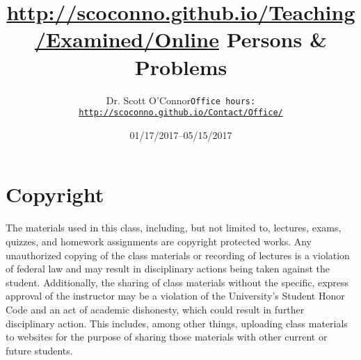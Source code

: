 \documentclass[article,oneside]{memoir}
\def\myauthor{Author}
\def\mytitle{Title}
\def\mycopyright{\myauthor}
\def\myweb{\href{http://scoconno.github.io/Teaching/Examined/Online}{http://scoconno.github.io/Teaching/Examined/Online}}
\def\myauthor{Dr. Scott O'Connor}
\def\mytitle{{\normalsize \myweb \newline} \HUGE Persons \& Problems}
\begin{document}
\setsansfont[Mapping=tex-text]{Myriad Pro} 
\setmonofont[Mapping=tex-text,Scale=0.8]{Georgia} 

\def\ind{\hangindent=1 true cm\hangafter=1 \noindent}
\def\labelitemi{$\cdot$}


\title{\LARGE \mytitle}     
\author{\Large\myauthor \newline \footnotesize\texttt{\noindent Office hours: \href{http://scoconno.github.io/Contact/Office/}{http://scoconno.github.io/Contact/Office/}}}
\date{01/17/2017--05/15/2017}


\maketitle




%
%

\section{Copyright}
The materials used in this class, including, but not limited to, lectures, exams, quizzes, and homework assignments are copyright protected works.  Any unauthorized copying of the class materials or recording of lectures is a violation of federal law and may result in disciplinary actions being taken against the student.  Additionally, the sharing of class materials without the specific, express approval of the instructor may be a violation of the University's Student Honor Code and an act of academic dishonesty, which could result in further disciplinary action.  This includes, among other things, uploading class materials to websites for the purpose of sharing those materials with other current or future students. 
\end{document}
